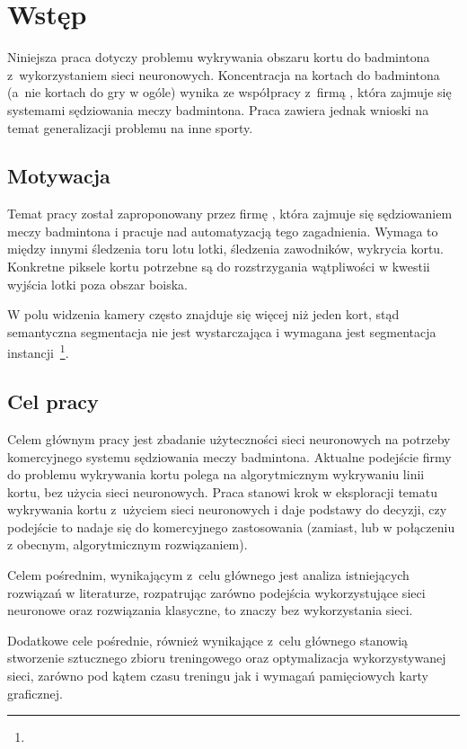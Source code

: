 \chapter{Wstęp}

Niniejsza praca dotyczy problemu wykrywania obszaru kortu do badmintona z~wykorzystaniem sieci neuronowych.
Koncentracja na kortach do badmintona (a~nie kortach do gry w ogóle) wynika ze współpracy z~firmą \blue, która zajmuje się systemami sędziowania meczy badmintona.
Praca zawiera jednak wnioski na temat generalizacji problemu na inne sporty.

\section{Motywacja}

Temat pracy został zaproponowany przez firmę \blue, która zajmuje się sędziowaniem meczy badmintona i pracuje nad automatyzacją tego zagadnienia.
Wymaga to między innymi śledzenia toru lotu lotki, śledzenia zawodników, wykrycia kortu.
Konkretne piksele kortu potrzebne są do rozstrzygania wątpliwości w kwestii wyjścia lotki poza obszar boiska.

W polu widzenia kamery często znajduje się więcej niż jeden kort, stąd semantyczna segmentacja nie jest wystarczająca i wymagana jest segmentacja instancji~\footnote{}.

\section{Cel pracy}

Celem głównym pracy jest zbadanie użyteczności sieci neuronowych na potrzeby komercyjnego systemu sędziowania meczy badmintona.
Aktualne podejście firmy \blue do problemu wykrywania kortu polega na algorytmicznym wykrywaniu linii kortu, bez użycia sieci neuronowych.
Praca stanowi krok w eksploracji tematu wykrywania kortu z~użyciem sieci neuronowych i daje podstawy do decyzji, czy podejście to nadaje się do komercyjnego zastosowania (zamiast, lub w połączeniu z obecnym, algorytmicznym rozwiązaniem).

Celem pośrednim, wynikającym z~celu głównego jest analiza istniejących rozwiązań w literaturze, rozpatrując zarówno podejścia wykorzystujące sieci neuronowe oraz rozwiązania klasyczne, to znaczy bez wykorzystania sieci.

Dodatkowe cele pośrednie, również wynikające z~celu głównego stanowią stworzenie sztucznego zbioru treningowego oraz optymalizacja wykorzystywanej sieci, zarówno pod kątem czasu treningu jak i wymagań pamięciowych karty graficznej.

